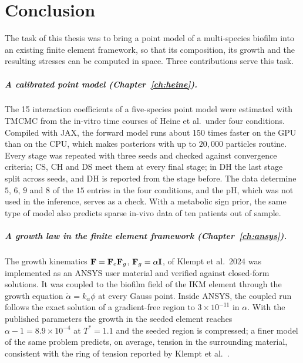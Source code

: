 \chapter{Conclusion}
\label{ch:conclusion}


The task of this thesis was to bring a point model of a multi-species biofilm
into an existing finite element framework, so that its composition, its growth
and the resulting stresses can be computed in space. Three contributions serve
this task.

\paragraph{A calibrated point model (Chapter~\ref{ch:heine}).}
The 15 interaction coefficients of a five-species point model were estimated
with TMCMC from the in-vitro time courses of Heine et al.\ under four
conditions. Compiled with JAX, the forward model runs about 150 times faster
on the GPU than on the CPU, which makes posteriors with up to $20{,}000$ particles routine. Every stage was
repeated with three seeds and checked against convergence criteria; CS, CH and DS
meet them at every final stage; in DH the last stage split across seeds, and DH
is reported from the stage before. The data
determine $5$, $6$, $9$ and $8$ of the $15$ entries in the four conditions, and the
pH, which was not used in the inference, serves as a check. With a metabolic sign prior, the same type of model
also predicts sparse in-vivo data of ten patients out of sample.

\paragraph{A growth law in the finite element framework (Chapter~\ref{ch:ansys}).}
The growth kinematics $\mathbf{F}=\mathbf{F}_e\mathbf{F}_g$, $\mathbf{F}_g=\alpha\mathbf{I}$, of Klempt et
al.\ 2024 was implemented as an ANSYS user material and verified against
closed-form solutions. It was coupled to the biofilm field of the IKM element
through the growth equation $\dot\alpha=k_\alpha\phi$ at every Gauss point.
Inside ANSYS, the coupled run follows the exact solution of a gradient-free
region to $3\times10^{-11}$ in $\alpha$. With the published parameters the
growth in the seeded element reaches $\alpha-1=8.9\times10^{-4}$ at $T^*=1.1$
and the seeded region is compressed; a finer model of the same problem
predicts, on average, tension in the surrounding material, consistent with the
ring of tension reported by Klempt et al.~\cite{Klempt2024DiffusionDrivenGrowth}.

